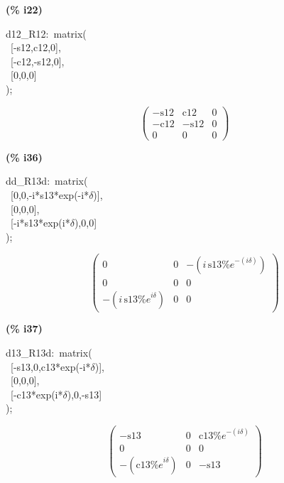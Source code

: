 \documentclass[fleqn]{article}
\begin{document}
\noindent
\begin{minipage}[t]{4.000000em}\color{red}\bfseries
(\% i22)	
\end{minipage}
\begin{minipage}[t]{\textwidth}\color{blue}
d12\_R12:\ matrix(\\
\ [-s12,c12,0],\ \\
\ [-c12,-s12,0],\ \\
\ [0,0,0]\\
);
\end{minipage}
\[\displaystyle \tag{d12\_ R12} 
\begin{pmatrix}\mathop{-}\ensuremath{\mathrm{s12}} & \ensuremath{\mathrm{c12}} & 0\\
\mathop{-}\ensuremath{\mathrm{c12}} & \mathop{-}\ensuremath{\mathrm{s12}} & 0\\
0 & 0 & 0\end{pmatrix}\mbox{}
\]


\noindent
\begin{minipage}[t]{4.000000em}\color{red}\bfseries
(\% i36)	
\end{minipage}
\begin{minipage}[t]{\textwidth}\color{blue}
dd\_R13d:\ matrix(\\
\ [0,0,-i*s13*exp(-i*\ensuremath{\delta})],\ \\
\ [0,0,0],\ \\
\ [-i*s13*exp(i*\ensuremath{\delta}),0,0]\\
);
\end{minipage}
\[\displaystyle \tag{dd\_ R13d} 
\begin{pmatrix}0 & 0 & \mathop{-}\left( i\, \ensuremath{\mathrm{s13}} {{\% e}^{-\left( i \delta \right) }}\right) \\
0 & 0 & 0\\
\mathop{-}\left( i\, \ensuremath{\mathrm{s13}} {{\% e}^{i \delta }}\right)  & 0 & 0\end{pmatrix}\mbox{}
\]


\noindent
\begin{minipage}[t]{4.000000em}\color{red}\bfseries
(\% i37)	
\end{minipage}
\begin{minipage}[t]{\textwidth}\color{blue}
d13\_R13d:\ matrix(\\
\ [-s13,0,c13*exp(-i*\ensuremath{\delta})],\ \\
\ [0,0,0],\ \\
\ [-c13*exp(i*\ensuremath{\delta}),0,-s13]\\
);
\end{minipage}
\[\displaystyle \tag{d13\_ R13d} 
\begin{pmatrix}\mathop{-}\ensuremath{\mathrm{s13}} & 0 & \ensuremath{\mathrm{c13}} {{\% e}^{-\left( i \delta \right) }}\\
0 & 0 & 0\\
\mathop{-}\left( \ensuremath{\mathrm{c13}} {{\% e}^{i \delta }}\right)  & 0 & \mathop{-}\ensuremath{\mathrm{s13}}\end{pmatrix}\mbox{}
\]
\end{document}
